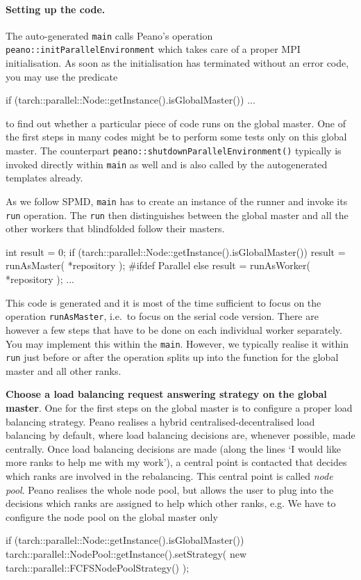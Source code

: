 \paragraph{Setting up the code.}

The auto-generated \texttt{main} calls Peano's operation \newline
\texttt{peano::initParallelEnvironment} which takes care of a proper MPI
initialisation. 
As soon as the initialisation has terminated without an error code, you may use
the predicate

\begin{code}
if (tarch::parallel::Node::getInstance().isGlobalMaster()) {
  ...
}
\end{code}

\noindent
to find out whether a particular piece of code runs on the global master. 
One of the first steps in many codes might be to perform some tests only on this
global master.
The counterpart \texttt{peano::shutdownParallelEnvironment()} typically is
invoked directly within \texttt{main} as well and is also called by the
autogenerated templates already.

As we follow SPMD, \texttt{main} has to create an instance of the runner and
invoke its \texttt{run} operation. 
The \texttt{run} then distinguishes between the global master and all the other
workers that blindfolded follow their masters. 
\begin{code}
  int result = 0;
  if (tarch::parallel::Node::getInstance().isGlobalMaster()) {
    result = runAsMaster( *repository );
  }
  #ifdef Parallel
  else {
    result = runAsWorker( *repository );
  }
  ...
\end{code}

\noindent
This code is generated and it is most of the time sufficient to focus on the
operation \texttt{runAsMaster}, i.e.~to focus on the serial code version. There
are however a few steps that have to be done on each individual worker
separately. 
You may implement this within the \texttt{main}.
However, we typically realise it within \texttt{run} just before or after the
operation splits up into the function for the global master and all other ranks.


{\bf Choose a load balancing request answering strategy on the global master}.
One for the first steps on the global master is to configure a
proper load balancing strategy. 
Peano realises a hybrid centralised-decentralised load balancing by default,
where load balancing decisions are, whenever possible, made centrally. 
Once load balancing decisions are made (along the lines `I would like more
ranks to help me with my work'), a central point is contacted that decides which
ranks are involved in the rebalancing.
This central point is called {\em node pool}.
Peano realises the whole node pool, but allows the user to plug into the
decisions which ranks are assigned to help which other ranks, e.g.
We have to configure the node pool on the global master only
\begin{code}
if (tarch::parallel::Node::getInstance().isGlobalMaster()) {
  tarch::parallel::NodePool::getInstance().setStrategy(
    new tarch::parallel::FCFSNodePoolStrategy()
  );
}
\end{code}

